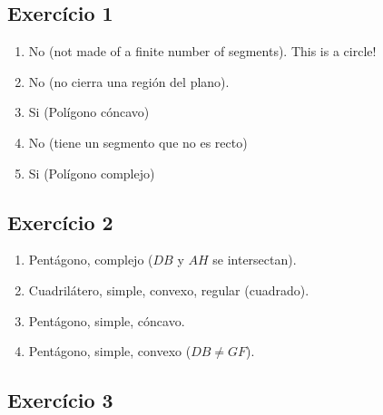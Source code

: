 \subsection*{Exercício 1}

\begin{enumerate}

\item No (not made of a finite number of segments). This is a circle!
\item No (no cierra una región del plano).
\item Si (Polígono cóncavo)
\item No (tiene un segmento que no es recto)
\item Si (Polígono complejo)
\end{enumerate}

\subsection*{Exercício 2}

\begin{enumerate}
  \item Pentágono, complejo ($DB$ y $AH$ se intersectan).
  \item Cuadrilátero, simple, convexo, regular (cuadrado).
  \item Pentágono, simple, cóncavo.
  \item Pentágono, simple, convexo ($DB \neq GF$).
\end{enumerate}

\subsection*{Exercício 3}


